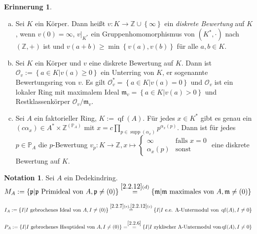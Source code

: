 \documentclass[
twoside=semi,
fontsize=12,
DIV=12, 
cleardoublepage=current,
leqno,
headings=optiontoheadandtoc, 
toc=idx
]{scrbook}
\newcommand{\Z}{\mathbb{Z}}
\renewcommand{\P}{\mathbb{P}}
\newcommand{\set}[1]{\left\{ #1 \right\}}
\DeclareMathOperator{\supp}{supp}
\DeclareMathOperator{\qf}{qf}
\theoremstyle{definition}
\newtheorem{notation}[definition]{Notation}
\newtheorem{erinnerung}[definition]{Erinnerung}
\begin{document}
 	\begin{erinnerung}\label{2.6.2}
 		\begin{enumerate}[(a)]
 			\item Sei $K$ ein K\"orper. Dann hei\ss t $v:K \to \Z \cup \set{\infty}$ ein \emph{diskrete Bewertung} auf $K$, wenn $v(0) = \infty$, $v\big|_{K^*}$ ein Gruppenhomomorphismus von $(K^*, \cdot)$ nach $(\Z, +)$ ist und $v(a + b)\geq \min \set{v(a), v(b)}$ f\"ur alle $a, b \in K$.
 			
 			\item Sei $K$ ein K\"orper und $v$ eine diskrete Bewertung auf $K$. Dann ist $\mathcal{O}_v := \set{a \in K| v(a) \geq 0}$ ein Unterring von $K$, er sogenannte Bewertungsring von $v$. Es gilt 
 			$\mathcal{O}_v^* = \set{a \in K| v(a) = 0}$ und $\mathcal{O}_v$ ist ein lokaler Ring mit maximalem Ideal $\mathfrak{m}_v = \set{a \in K| v(a) > 0}$ und Restklassenk\"orper $\mathcal{O}_v / \mathfrak{m}_v$.
 			
 			\item Sei $A$ ein faktorieller Ring, $K:= \qf(A)$. F\"ur jedes $x \in K^*$ gibt es genau ein $(c \alpha_x) \in A^*\times \Z^{(\P_A)}$ mit $x = c \prod_{p \in \supp(\alpha_x)} p^{\alpha_x(p)}$. Dann ist f\"ur jedes $p \in \P_A$ die $p$-Bewertung $v_p: K \to \Z, x \mapsto \begin{cases}
 				\infty & \textrm{falls } x = 0\\
 				\alpha_x(p) & \textrm{sonst}
 			\end{cases}$ eine diskrete Bewertung auf $K$.
 		\end{enumerate}
 	\end{erinnerung}
 
 	\begin{notation}\label{2.6.3}
 		Sei $A$ ein Dedekindring.  $M_A := \set{\mathfrak{p}| \mathfrak{p} \textrm{ Primideal von } A, \mathfrak{p} \neq (0)} \overset{\ref{2.2.12}(d)}{=} \set{\mathfrak{m}| \mathfrak{m} \textrm{ maximales von } A, \mathfrak{m} \neq (0)}$
 		
 		$I_A := \set{I| I \textrm{ gebrochenes Ideal von } A, I \neq (0)} \overset{\ref{2.2.7}(e), \ref{2.2.12}(c)}{=} \set{I | I \textrm{ e.e. A-Untermodul von } \qf(A), I \neq 0}$
 		
 		$P_A := \set{I| I \textrm{ gebrochenes Hauptideal von } A, I \neq (0)} = \overset{\ref{2.2.6}}{=} \set{I | I \textrm{ zyklischer A-Untermodul von} \qf(A), I \neq 0}$
 	\end{notation}
 
\end{document}
